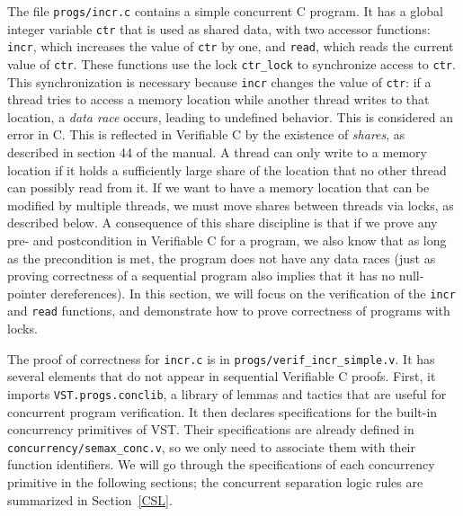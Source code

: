 \documentclass[11pt]{article}
\begin{document}
The file \texttt{progs/incr.c} contains a simple concurrent C program. It has a global integer variable \texttt{ctr} that is used as shared data, with two accessor functions: \texttt{incr}, which increases the value of \texttt{ctr} by one, and \texttt{read}, which reads the current value of \texttt{ctr}. These functions use the lock \texttt{ctr\_lock} to synchronize access to \texttt{ctr}. This synchronization is necessary because \texttt{incr} changes the value of \texttt{ctr}: if a thread tries to access a memory location while another thread writes to that location, a \emph{data race} occurs, leading to undefined behavior. This is considered an error in C. This is reflected in Verifiable C by the existence of \emph{shares}, as described in section 44 of the manual. A thread can only write to a memory location if it holds a sufficiently large share of the location that no other thread can possibly read from it. If we want to have a memory location that can be modified by multiple threads, we must move shares between threads via locks, as described below. A consequence of this share discipline is that if we prove any pre- and postcondition in Verifiable C for a program, we also know that as long as the precondition is met, the program does not have any data races (just as proving correctness of a sequential program also implies that it has no null-pointer dereferences). In this section, we will focus on the verification of the \texttt{incr} and \texttt{read} functions, and demonstrate how to prove correctness of programs with locks.

The proof of correctness for \texttt{incr.c} is in \texttt{progs/verif\_incr\_simple.v}. It has several elements that do not appear in sequential Verifiable C proofs. First, it imports \texttt{VST.progs.conclib}, a library of lemmas and tactics that are useful for concurrent program verification. It then declares specifications for the built-in concurrency primitives of VST. Their specifications are already defined in \texttt{concurrency/semax\_conc.v}, so we only need to associate them with their function identifiers. We will go through the specifications of each concurrency primitive in the following sections; the concurrent separation logic rules are summarized in Section~\ref{CSL}.
\end{document}
